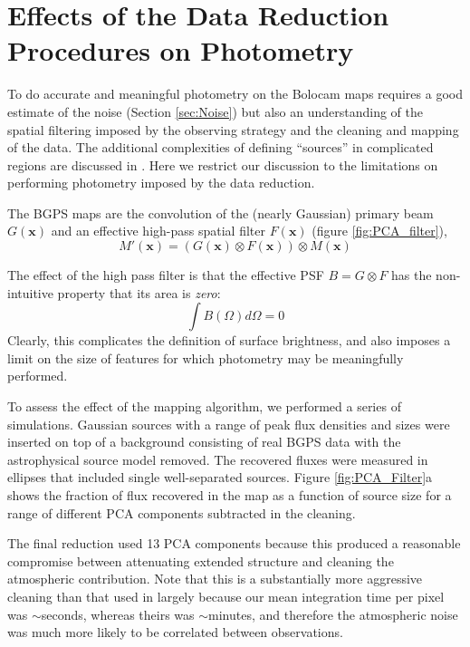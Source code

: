 \documentclass[12pt,preprint]{aastex}
\newcommand{\vect}[1]{\mathbf{#1}}
\newcommand{\xad}{\vect{x}}
\begin{document}
\section{Effects of the Data Reduction Procedures on Photometry}
\label{sec:Photometry}

To do accurate and meaningful photometry on the Bolocam maps requires
a good estimate of the noise (Section \ref{sec:Noise}) but also an
understanding of the spatial filtering imposed by the observing
strategy and the cleaning and mapping of the data.  
The additional
complexities of defining ``sources'' in complicated regions are discussed in
\citet{rosolowsky09}.  Here we restrict our discussion to the limitations
on performing photometry imposed by the data reduction.

The BGPS maps are the convolution of the (nearly Gaussian)
primary beam $G(\xad)$ and an effective high-pass
spatial filter $F(\xad)$ (figure \ref{fig:PCA_filter}),
\[
M'(\xad) = (G(\xad) \otimes F(\xad)) \otimes M(\xad)
\]

The effect of the high pass filter is that the effective PSF $B=G
\otimes F$ has the non-intuitive property that its area is {\em zero}:
\[
\int{B(\Omega) d\Omega} = 0
\]
Clearly, this complicates the definition of surface brightness, and
also imposes a limit on the size of features for which photometry may
be meaningfully performed.

To assess the effect of the mapping algorithm, we performed a series
of simulations.  Gaussian sources with a range of peak flux densities and sizes
were inserted on top of a background consisting of real BGPS data with the
astrophysical source model removed.  The recovered fluxes were measured in
ellipses that included single well-separated sources.  Figure
\ref{fig:PCA_Filter}a shows the fraction of flux recovered in the map as a
function of source size for a range of different PCA components subtracted in
the cleaning.  


The final reduction used 13 PCA components because this produced a
reasonable compromise between attenuating extended structure and
cleaning the atmospheric contribution.  Note that this is a substantially
more aggressive cleaning than that used in \citet{enoch06} largely because
our mean integration time per pixel was $\sim$seconds, whereas theirs was
$\sim$minutes, and therefore the atmospheric noise was much more likely to
be correlated between observations.
\end{document}
